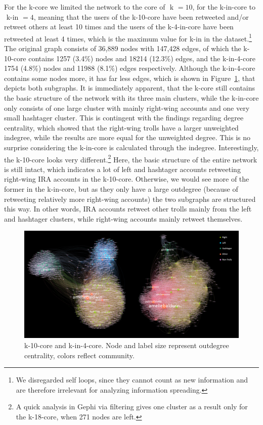 \documentclass[12pt, titlepage=true, toc=bib]{scrartcl}
\begin{document}
For the k-core we limited the network to the core of \( \text{ k } = 10 \), for the k-in-core to \( \text{ k-in } = 4 \), meaning that the users of the k-10-core have been retweeted and/or retweet others at least 10 times and the users of the k-4-in-core have been retweeted at least 4 times, which is the maximum value for k-in in the dataset.\footnote{We disregarded self loops, since they cannot count as new information and are therefore irrelevant for analyzing information spreading.} The original graph consists of 36,889 nodes with 147,428 edges, of which the k-10-core contains 1257 (3.4\%) nodes and 18214 (12.3\%) edges, and the k-in-4-core 1754 (4.8\%) nodes and 11988 (8.1\%) edges respectively. Although the k-in-4-core contains some nodes more, it has far less edges, which is shown in Figure~\ref{fig:kcore}, that depicts both subgraphs. It is immediately apparent, that the k-core still contains the basic structure of the network with its three main clusters, while the k-in-core only consists of one large cluster with mainly right-wing accounts and one very small hashtager cluster. This is contingent with the findings regarding degree centrality, which showed that the right-wing trolls have a larger unweighted indegree, while the results are more equal for the unweighted degree. This is no surprise considering the k-in-core is calculated through the indegree. Interestingly, the k-10-core looks very different.\footnote{A quick analysis in Gephi via filtering gives one cluster as a result only for the k-18-core, when 271 nodes are left.} Here, the basic structure of the entire network is still intact, which indicates a lot of left and hashtager accounts retweeting right-wing IRA accounts in the k-10-core. Otherwise, we would see more of the former in the k-in-core, but as they only have a large outdegree (because of retweeting relatively more right-wing accounts) the two subgraphs are structured this way. In other words, IRA accounts retweet other trolls mainly from the left and hashtager clusters, while right-wing accounts mainly retweet themselves.

\begin{figure}[!ht]
\centering
\includegraphics[width=0.95\linewidth]{final_k_graphs.png}
\caption{k-10-core and k-in-4-core. Node and label size represent outdegree centrality, colors reflect community.}
\label{fig:kcore}
\end{figure}
\end{document}
